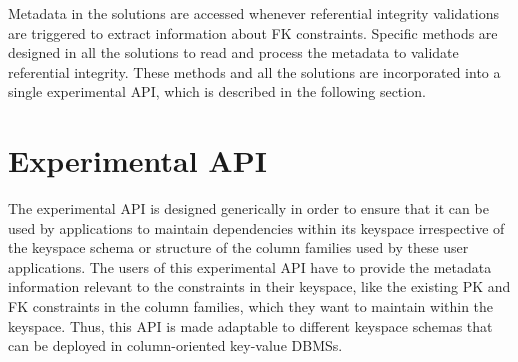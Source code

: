 
Metadata in the solutions are accessed whenever referential integrity
validations are triggered to extract information about \ac{FK} constraints. 
Specific methods are designed in all the solutions to read and process the
metadata to validate referential integrity.  These methods and all the solutions
are incorporated into a single experimental \ac{API}, which is described in the
following section.

\section{Experimental API}\label{s:API}

The experimental \ac{API} is designed generically in order to ensure
that it can be used by  applications to maintain dependencies within its
keyspace irrespective of the keyspace schema or structure of the column
families used by these user applications.
The users of this experimental \ac{API}  have to provide the metadata
information relevant to the constraints in their keyspace, like the existing
\ac{PK} and \ac{FK} constraints in the column families, which they want to
maintain within the keyspace. 
Thus,  this \ac{API}
is made adaptable to different keyspace schemas  that can be deployed in
column-oriented key-value \acp{DBMS}.  

